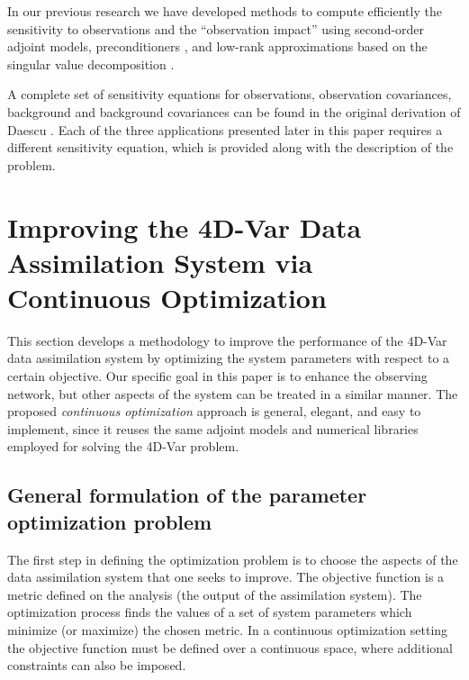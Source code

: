 \documentclass{article}
\begin{document}
In our previous research we have developed methods to compute efficiently the sensitivity to observations
and the ``observation impact'' using second-order adjoint models, preconditioners \cite{Cioaca_2012}, and
low-rank approximations based on the singular value decomposition \cite{Cioaca_2013}. 

A complete set of sensitivity equations for observations, observation covariances, background and
background covariances can be found in the original derivation of Daescu \cite{Daescu_2008}.
Each of the three applications presented later in this paper requires a different sensitivity equation,
which is provided along with the description of the problem.




\section{Improving the 4D-Var Data Assimilation System via Continuous Optimization}\label{sec:optobs_contopt}


This section develops a methodology to improve the performance of the 4D-Var data assimilation system  
by optimizing the system parameters with respect to a certain objective.
Our specific goal in this paper is to enhance the observing network, but other aspects of the system can be 
treated in a similar manner.
The proposed \textit{continuous optimization} approach is general, elegant, and easy to implement,
since it reuses the same adjoint models and numerical libraries employed for solving the 4D-Var problem.


\subsection{General formulation of the parameter optimization problem}


The first step in defining the optimization problem is to choose the aspects of the data assimilation system that one seeks to improve.
The objective function is a metric defined on the analysis (the output of the assimilation system).
The optimization process finds the values of a set of system parameters 
which minimize (or maximize) the chosen metric.
In a continuous optimization setting the objective function must be  defined 
over a continuous space, where additional constraints can also be imposed.
\end{document}

